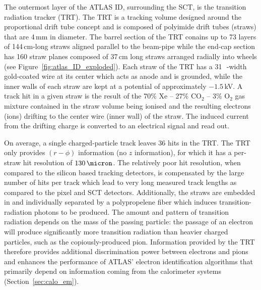 The outermost layer of the ATLAS ID, surrounding the SCT, is the transition
radiation tracker (TRT).
The TRT is a tracking volume designed around the proportional drift tube concept
and is composed of polyimide drift tubes (straws) that are 4\,mm in diameter.
The barrel section of the TRT conains up to 73 layers of 144\,cm-long straws aligned parallel to the
beam-pipe while the end-cap section has 160 straw planes composed of 37\,cm long straws arranged radially
into wheels (see Figure~\ref{fig:atlas_ID_exploded}).
Each straw of the TRT has a 31\,\micron~-width gold-coated wire at its center which acts as anode
and is grounded, while the inner walls of each straw are kept at a potential of
approximately $-1.5$\,kV.
A track hit in a given straw is the result of the 70\% Xe -- 27\% CO$_2$ -- 3\% O$_2$ gas mixture contained
in the straw volume being ionised and the resulting electrons (ions) drifting to
the center wire (inner wall) of the straw. The induced current from the drifting
charge is converted to an electrical signal and read out.

On average, a single charged-particle track leaves 36 hits in the TRT.
The TRT only provides $(r-\phi)$ information (no $z$ information),
for which it has a per-straw hit resolution of $130\,\micron$.
The relatively poor hit resolution, when compared to the silicon based
tracking detectors, is compensated by the large number of hits per track which
lead to very long measured track lengths as compared to the pixel and SCT detectors.
Additionally, the straws are embedded in and individually separated by
a polypropelene fiber which induces transition-radiation photons to be produced.
The amount and pattern of transition radiation depends on the mass of the passing
particle: the passage of an electron will produce significantly more transition radiation
than heavier charged particles, such as the copiously-produced pion.
Information provided by the TRT therefore provides additional discrimination
power between electrons and pions and enhances the performance of ATLAS' electron identification algorithms
that primarily depend on information coming from the calorimeter systems (Section~\ref{sec:calo_em}).
